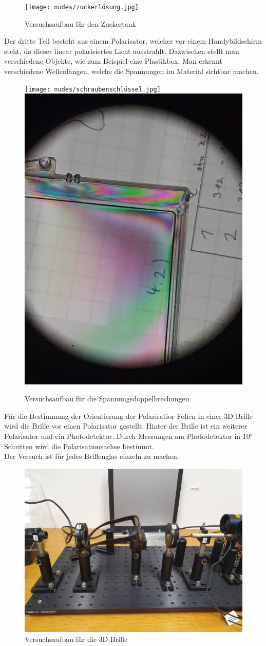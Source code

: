 \documentclass[12pt,a4paper,twoside]{article}
\begin{document}
\begin{figure}[H]
    \centering
    \texttt{[image: nudes/zuckerlösung.jpg]}
    \caption{Versuchsaufbau für den Zuckertank}
    \label{fig:zucker aufbau}
\end{figure}

\noindent
Der dritte Teil besteht aus einem Polarisator, welcher vor einem Handybildschirm steht, da dieser linear polarisiertes Licht ausstrahlt. 
Dazwischen stellt man verschiedene Objekte, wie zum Beispiel eine Plastikbox. Man erkennt verschiedene Wellenlängen, welche die Spannungen im Material sichtbar machen. 

\begin{figure}[H]
    \centering
    \texttt{[image: nudes/schraubenschlüssel.jpg]}
    \includegraphics[width=0.6\linewidth, angle=-90]{nudes/plastikecke.jpg}
    \caption{Versuchsaufbau für die Spannungsdoppelbrechungen}
    \label{fig:Spannungsdoppelbrechungen aufbau}
\end{figure}

\noindent
Für die Bestimmung der Orientierung der Polarisatior Folien in einer 3D-Brille wird die Brille vor einen Polarisator gestellt. Hinter der Brille ist ein weiterer Polarisator und ein Photodetektor. 
Durch Messungen am Photodetektor in 10° Schritten wird die Polarisationsachse bestimmt. 
\\
Der Versuch ist für jedes Brillenglas einzeln zu machen. 

\begin{figure}[H]
    \centering
    \includegraphics[width=0.6\linewidth]{nudes/3d-brille aufbau.jpg}
    \caption{Versuchsaufbau für die 3D-Brille}
    \label{fig:3D Brille aufbau}
\end{figure}
\end{document}
